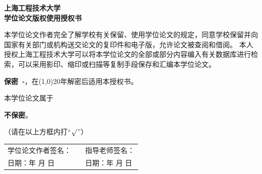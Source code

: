 \newcommand{\checkdone}{\rlap{$\square$}{\raisebox{2pt}{\large\hspace{1pt}\cmark}}\hspace{-2.5pt}}
\newcommand{\checkundone}{$\square$}
\begin{center}
    \heiti\sanhao\textbf{
        上海工程技术大学 \\
        学位论文版权使用授权书}
\end{center}

本学位论文作者完全了解学校有关保留、使用学位论文的规定，同意学校保留并向国家有关部门或机构送交论文的复印件和电子版，允许论文被查阅和借阅。
本人授权上海工程技术大学可以将本学位论文的全部或部分内容编入有关数据库进行检索，可以采用影印、缩印或扫描等复制手段保存和汇编本学位论文。

\hspace{8em}\textbf{保密~}\checkundone ，在\line(1,0){20}年解密后适用本授权书。

本学位论文属于

\hspace{8em}\textbf{不保密}\checkdone 。

（请在以上方框内打\quad “\emph{$\surd$}”）

\vspace{15em}
\begin{table}[hbpt]
    \centering
    \renewcommand\arraystretch{1.8}
    \begin{tabular}{p{6cm}<{\raggedright}p{2cm}<{\centering}p{6cm}<{\raggedright}}
        学位论文作者签名：                     &  & 指导老师签名：                       \\
        日期：\qquad 年 \qquad 月 \qquad 日 &  & 日期：\qquad 年 \qquad 月 \qquad 日
    \end{tabular}
\end{table}
\newpage
